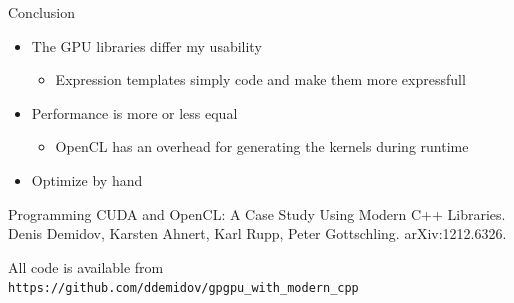 \documentclass{beamer}
\newcommand{\rem}[1]{}
\newcommand{\heading}[1]{\centerline{\Large #1} \vspace{0.5em}}
\begin{document}
\begin{frame}[fragile]
 \heading{Conclusion}

 \begin{itemize}
  \item The GPU libraries differ my usability
  \begin{itemize} \item Expression templates simply code and make them more expressfull \end{itemize}
  \item Performance is more or less equal
  \begin{itemize} \item OpenCL has an overhead for generating the kernels during runtime \end{itemize}
  \item Optimize by hand
 \end{itemize}

 \vspace{2ex}
 {\scriptsize Programming CUDA and OpenCL: A Case Study Using Modern C++ Libraries. Denis Demidov, Karsten Ahnert, Karl Rupp, Peter Gottschling. arXiv:1212.6326.}

 \vspace{2ex}
 {\scriptsize All code is available from {\tt https://github.com/ddemidov/gpgpu\_with\_modern\_cpp} }

\end{frame}





\rem{




%



%
}
\end{document}
